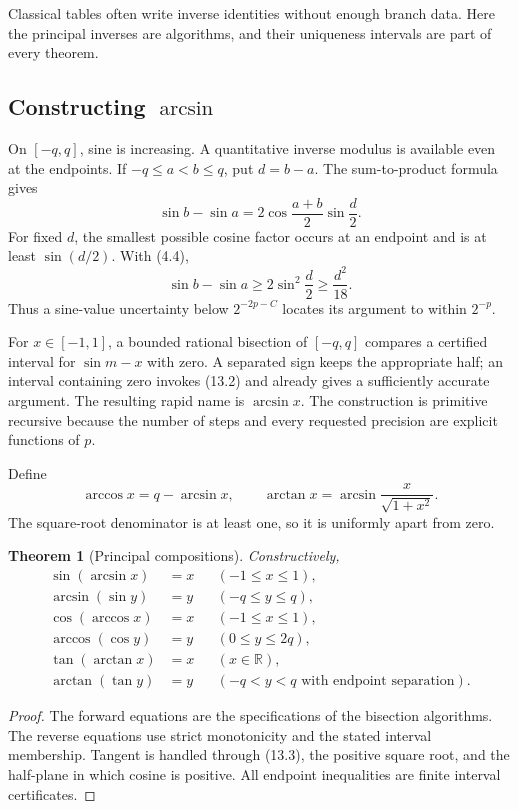 \documentclass[11pt]{article}
\newtheorem{theorem}{Theorem}[section]
\theoremstyle{definition}
\newcommand{\R}{\mathbb R}
\begin{document}
Classical tables often write inverse identities without enough branch data.
Here the principal inverses are algorithms, and their uniqueness intervals are
part of every theorem.

\subsection{Constructing \(\arcsin\)}

On \([-q,q]\), sine is increasing.  A quantitative inverse modulus is available
even at the endpoints.  If \(-q\le a<b\le q\), put \(d=b-a\).  The
sum-to-product formula gives
\[
 \sin b-\sin a
 =2\cos\frac{a+b}{2}\sin\frac d2.
 \tag{13.1}
\]
For fixed \(d\), the smallest possible cosine factor occurs at an endpoint and
is at least \(\sin(d/2)\).  With (4.4),
\[
 \sin b-\sin a\ge2\sin^2\frac d2\ge\frac{d^2}{18}.
 \tag{13.2}
\]
Thus a sine-value uncertainty below \(2^{-2p-C}\) locates its argument to
within \(2^{-p}\).

For \(x\in[-1,1]\), a bounded rational bisection of \([-q,q]\) compares a
certified interval for \(\sin m-x\) with zero.  A separated sign keeps the
appropriate half; an interval containing zero invokes (13.2) and already gives
a sufficiently accurate argument.  The resulting rapid name is
\(\arcsin x\).  The construction is primitive recursive because the number of
steps and every requested precision are explicit functions of \(p\).

Define
\[
 \arccos x=q-\arcsin x,
 \qquad
 \arctan x=\arcsin\frac{x}{\sqrt{1+x^2}}.
 \tag{13.3}
\]
The square-root denominator is at least one, so it is uniformly apart from
zero.

\begin{theorem}[Principal compositions]
Constructively,
\begin{align*}
 \sin(\arcsin x)&=x &&(-1\le x\le1),\\
 \arcsin(\sin y)&=y &&(-q\le y\le q),\\
 \cos(\arccos x)&=x &&(-1\le x\le1),\\
 \arccos(\cos y)&=y &&(0\le y\le2q),\\
 \tan(\arctan x)&=x &&(x\in\R),\\
 \arctan(\tan y)&=y &&(-q<y<q\text{ with endpoint separation}).
\end{align*}
\end{theorem}

\begin{proof}
The forward equations are the specifications of the bisection algorithms.
The reverse equations use strict monotonicity and the stated interval
membership.  Tangent is handled through (13.3), the positive square root, and
the half-plane in which cosine is positive.  All endpoint inequalities are
finite interval certificates.
\end{proof}
\end{document}
